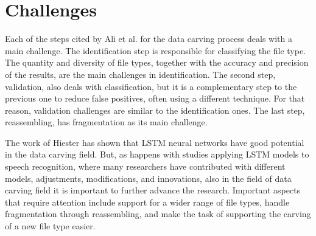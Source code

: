 \section{Challenges}

Each of the steps cited by Ali et al. \cite{ali_review_2018} for the data carving process deals with a main challenge. The identification step is responsible for classifying the file type. The quantity and diversity of file types, together with the accuracy and precision of the results, are the main challenges in identification. The second step, validation, also deals with classification, but it is a complementary step to the previous one to reduce false positives, often using a different technique. For that reason, validation challenges are similar to the identification ones. The last step, reassembling, has fragmentation as its main challenge.

The work of Hiester \cite{hiester_file_2018} has shown that LSTM neural networks have good potential in the data carving field. But, as happens with studies applying LSTM models to speech recognition, where many researchers have contributed with different models, adjustments, modifications, and innovations, also in the field of data carving field it is important to further advance the research. Important aspects that require attention include support for a wider range of file types, handle fragmentation through reassembling, and make the task of supporting the carving of a new file type easier.




